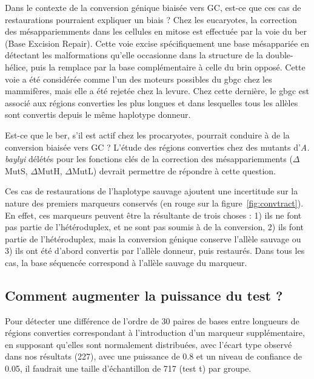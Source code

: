 Dans le contexte de la conversion génique biaisée vers GC, est-ce que ces cas de
restaurations pourraient expliquer un biais ? Chez les eucaryotes, la correction
des mésappariemments dans les cellules en mitose est effectuée par la voie du
\ac{ber} (Base Excision Repair). Cette voie excise spécifiquement une base
mésappariée en détectant les malformations qu'elle occasionne dans la structure
de la double-hélice, puis la remplace par la base complémentaire à celle du brin
opposé\cite{krokan_base_2013}. Cette voie a été considérée comme l'un des
moteurs possibles du \ac{gbgc} chez les mammifères\cite{duret_biased_2009}, mais
elle a été rejetée chez la levure\cite{lesecque_gc-biased_2013}. Chez cette
dernière, le \ac{gbgc} est associé aux régions converties les plus longues et
dans lesquelles tous les allèles sont convertis depuis le même haplotype
donneur.

Est-ce que le \ac{ber}, s'il est actif chez les procaryotes, pourrait conduire à
de la conversion biaisée vers GC ? L'étude des régions converties chez des
mutants d'\emph{A. baylyi} délétés pour les fonctions clés de la correction des
mésappariemments ($\Delta$MutS, $\Delta$MutH, $\Delta$MutL) devrait permettre de
répondre à cette question.

Ces cas de restaurations de l'haplotype sauvage ajoutent une incertitude sur la
nature des premiers marqueurs conservés (en rouge sur la
figure~\ref{fig:convtract}). En effet, ces marqueurs peuvent être la résultante
de trois choses : 1) ils ne font pas partie de l'hétéroduplex, et ne sont pas
soumis à de la conversion, 2) ils font partie de l'hétéroduplex, mais la
conversion génique conserve l'allèle sauvage ou 3) ils ont été d'abord convertis
par l'allèle donneur, puis restaurés. Dans tous les cas, la base séquencée
correspond à l'allèle sauvage du marqueur.

\subsection{Comment augmenter la puissance du test ?}
\label{subsub:discu-puissance}

Pour détecter une différence de l'ordre de \num{30} paires de bases entre
longueurs de régions converties correspondant à l'introduction d'un marqueur
supplémentaire, en supposant qu'elles sont normalement distribuées, avec l'écart
type observé dans nos résultats (\num{227}), avec une puissance de \num{0.8} et
un niveau de confiance de \num{0.05}, il faudrait une taille d'échantillon de
\num{717} (test \textrm{t}) par groupe.

